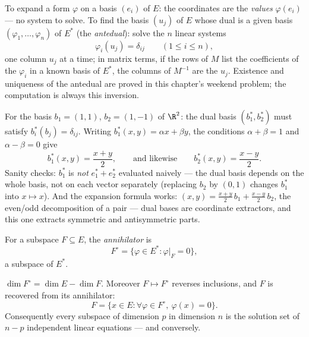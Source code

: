 \begin{method}\label{met:b2:linalg:dualbasis}
To expand a form $\varphi$ on a basis $(e_i)$ of $E$: the
coordinates are the \emph{values} $\varphi(e_i)$ --- no system to
solve. To find the basis $(u_j)$ of $E$ whose dual is a given
basis $(\varphi_1, \dots, \varphi_n)$ of $E^*$ (the
\emph{antedual}): solve the $n$ linear systems
\[
\varphi_i(u_j) = \delta_{ij} \qquad (1 \leq i \leq n),
\]
one column $u_j$ at a time; in matrix terms, if the rows of $M$
list the coefficients of the $\varphi_i$ in a known basis of
$E^*$, the columns of $M^{-1}$ are the $u_j$. Existence and
uniqueness of the antedual are proved in this chapter's weekend
problem; the computation is always this inversion.
\end{method}

\begin{example}\label{ex:b2:linalg:dualbasis2d}
For the basis $b_1 = (1, 1)$, $b_2 = (1, -1)$ of $\R^2$: the
dual basis $(b_1^*, b_2^*)$ must satisfy $b_i^*(b_j) =
\delta_{ij}$. Writing $b_1^*(x, y) = \alpha x + \beta y$, the
conditions $\alpha + \beta = 1$ and $\alpha - \beta = 0$ give
\[
b_1^*(x, y) = \frac{x + y}{2},
\qquad\text{and likewise}\qquad
b_2^*(x, y) = \frac{x - y}{2} .
\]
Sanity checks: $b_1^*$ is \emph{not} $e_1^* + e_2^*$ evaluated
naively --- the dual basis depends on the whole basis, not on
each vector separately (replacing $b_2$ by $(0, 1)$ changes
$b_1^*$ into $x \mapsto x$). And the expansion formula works:
$(x, y) = \frac{x+y}2\,b_1 + \frac{x-y}2\,b_2$, the even/odd
decomposition of a pair --- dual bases are coordinate
extractors, and this one extracts symmetric and antisymmetric
parts.
\end{example}

\begin{definition}[Annihilator]\label{def:b2:linalg:annihilator}
For a subspace $F \subseteq E$, the
\emph{annihilator} is
\[
F^{\circ} = \{\varphi \in E^* : \varphi|_F = 0\},
\]
a subspace of $E^*$.
\end{definition}

\begin{theorem}\label{thm:b2:linalg:annihilator}
$\dim F^{\circ} = \dim E - \dim F$. Moreover $F \mapsto F^\circ$
reverses inclusions, and $F$ is recovered from its annihilator:
\[
F = \{x \in E : \forall\varphi \in F^\circ,\ \varphi(x) = 0\}.
\]
Consequently every subspace of dimension $p$ in dimension $n$ is the
solution set of $n - p$ independent linear equations --- and
conversely.
\end{theorem}

